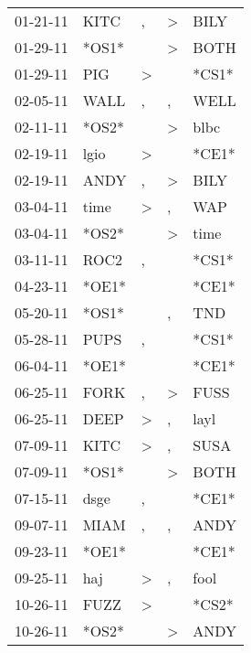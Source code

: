 \begin{supertabular}{lllll}
 01-21-11 &   KITC &                , &     \textgreater &   BILY \\
 01-29-11 &  *OS1* &                  &     \textgreater &   BOTH \\
 01-29-11 &    PIG &     \textgreater &                  &  *CS1* \\
 02-05-11 &   WALL &                , &                , &   WELL \\
 02-11-11 &  *OS2* &                  &     \textgreater &   blbc \\
 02-19-11 &   lgio &     \textgreater &                  &  *CE1* \\
 02-19-11 &   ANDY &                , &     \textgreater &   BILY \\
 03-04-11 &   time &     \textgreater &                , &    WAP \\
 03-04-11 &  *OS2* &                  &     \textgreater &   time \\
 03-11-11 &   ROC2 &                , &                  &  *CS1* \\
 04-23-11 &  *OE1* &                  &                  &  *CE1* \\
 05-20-11 &  *OS1* &                  &                , &    TND \\
 05-28-11 &   PUPS &                , &                  &  *CS1* \\
 06-04-11 &  *OE1* &                  &                  &  *CE1* \\
 06-25-11 &   FORK &                , &     \textgreater &   FUSS \\
 06-25-11 &   DEEP &     \textgreater &                , &   layl \\
 07-09-11 &   KITC &     \textgreater &                , &   SUSA \\
 07-09-11 &  *OS1* &                  &     \textgreater &   BOTH \\
 07-15-11 &   dsge &                , &                  &  *CE1* \\
 09-07-11 &   MIAM &                , &                , &   ANDY \\
 09-23-11 &  *OE1* &                  &                  &  *CE1* \\
 09-25-11 &    haj &     \textgreater &                , &   fool \\
 10-26-11 &   FUZZ &     \textgreater &                  &  *CS2* \\
 10-26-11 &  *OS2* &                  &     \textgreater &   ANDY \\

\end{supertabular}
